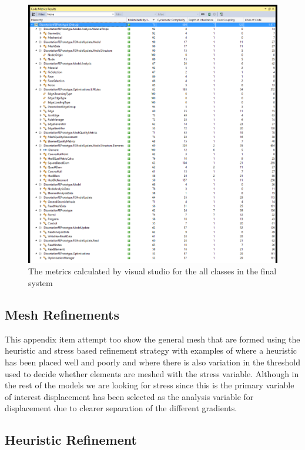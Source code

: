 \begin{figure}[H]
  \centerline{\includegraphics[width=165mm, scale=0.5]{../Graphics/qualityMetricsExpanded.png}}
  \caption{The metrics calculated by visual studio for the all classes in the final system}
\end{figure}


\subsection{Mesh Refinements}
This appendix item attempt too show the general mesh that are formed using the heuristic and stress based refinement strategy with examples of where a heuristic has been placed well and poorly and where there is also variation in the threshold used to decide whether elements are meshed with the stress variable. Although in the rest of the models we are looking for stress since this is the primary variable of interest displacement has been selected as the analysis variable for displacement due to clearer separation of the different gradients.


\subsection{Heuristic Refinement}



